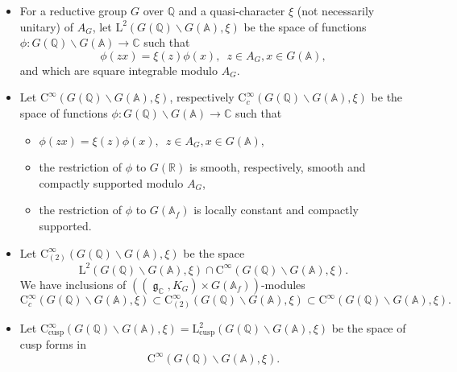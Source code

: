 \documentclass[11pt, a4paper]{amsart}
\theoremstyle{plain}
\theoremstyle{definition}
\numberwithin{equation}{section}
\def\AAA{\mathbb{A}}
\def\CC{\mathbb{C}}
\def\QQ{\mathbb{Q}}
\def\RR{\mathbb{R}}
\DeclareMathOperator{\lieg}{\mathfrak g}
\begin{document}
\begin{itemize}
    \item For a reductive group $G$ over $\QQ$ and a quasi-character $\xi$ (not necessarily unitary) of $A_{G}$,  let $\mathrm{L}^{2}(G(\QQ) \backslash G(\AAA), \xi)$ be the space of functions $\phi \colon G(\QQ) \backslash G(\AAA) \rightarrow \CC$ such that 
    \begin{equation*}
        \phi(zx) = \xi(z) \phi(x), \, \, \, z \in A_{G}, x \in G(\AAA), 
    \end{equation*}
    and which are square integrable modulo $A_{G}$. 
    \item Let $\mathrm{C}^{\infty}(G(\QQ) \backslash G(\AAA), \xi)$, respectively $\mathrm{C}_{c}^{\infty}(G(\QQ) \backslash G(\AAA), \xi)$ be the space of functions $\phi \colon G(\QQ) \backslash G(\AAA) \rightarrow \CC$ such that 
        \begin{itemize}
            \item $\phi(zx) = \xi(z) \phi(x), \, \, \, z \in A_{G}, x \in G(\AAA)$, 
            \item the restriction of $\phi$ to $G(\RR)$ is smooth, respectively, smooth and compactly supported modulo $A_{G}$, 
            \item the restriction of $\phi$ to $G(\AAA_f)$ is locally constant and compactly supported. 
        \end{itemize}
    \item Let $\mathrm{C}_{(2)}^{\infty}(G(\QQ) \backslash G(\AAA), \xi)$ be the space 
          \begin{equation*}
              \mathrm{L}^{2}(G(\QQ) \backslash G(\AAA), \xi) \cap \mathrm{C}^{\infty}(G(\QQ) \backslash G(\AAA), \xi). 
          \end{equation*}
          We have inclusions of  $((\lieg_{\CC}, K_{G}) \times G(\AAA_f))$-modules 
          \begin{equation*}
              \mathrm{C}_{c}^{\infty}(G(\QQ) \backslash G(\AAA), \xi) \subset \mathrm{C}_{(2)}^{\infty}(G(\QQ) \backslash G(\AAA), \xi) \subset \mathrm{C}^{\infty}(G(\QQ) \backslash G(\AAA), \xi). 
          \end{equation*}
    \item Let $\mathrm{C}_{\mathrm{cusp}}^{\infty}(G(\QQ) \backslash G(\AAA), \xi) = \mathrm{L}^{2}_{\mathrm{cusp}}(G(\QQ) \backslash G(\AAA), \xi)$ be the space of cusp forms in 
    \begin{equation*}
        \mathrm{C}^{\infty}(G(\QQ) \backslash G(\AAA), \xi). 
    \end{equation*}

\end{itemize}
\end{document}
